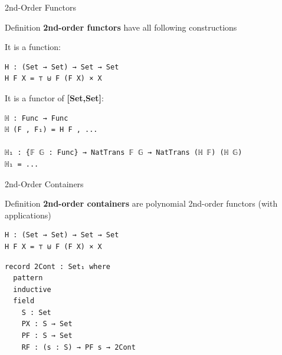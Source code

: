 \documentclass{beamer}
\begin{document}
\begin{frame}[fragile]{2nd-Order Functors}

\begin{block}{Definition}
\textbf{2nd-order functors} have all following constructions
\end{block}

It is a function:

\begin{exampleblock}{}
\begin{verbatim}
H : (Set → Set) → Set → Set
H F X = ⊤ ⊎ F (F X) × X
\end{verbatim}
\end{exampleblock}

It is a functor of \textbf{[Set,Set]}:

\begin{exampleblock}{}
\begin{verbatim}
ℍ : Func → Func
ℍ (F , F₁) = H F , ...

ℍ₁ : {𝔽 𝔾 : Func} → NatTrans 𝔽 𝔾 → NatTrans (ℍ 𝔽) (ℍ 𝔾)
ℍ₁ = ...
\end{verbatim}
\end{exampleblock}
\end{frame}

\begin{frame}[fragile]{2nd-Order Containers}

\begin{block}{Definition}
\textbf{2nd-order containers} are polynomial 2nd-order functors (with applications)
\end{block}

\begin{exampleblock}{}
\begin{verbatim}
H : (Set → Set) → Set → Set
H F X = ⊤ ⊎ F (F X) × X
\end{verbatim}
\end{exampleblock}

\begin{exampleblock}{}
\begin{verbatim}
record 2Cont : Set₁ where
  pattern
  inductive
  field
    S : Set
    PX : S → Set
    PF : S → Set
    RF : (s : S) → PF s → 2Cont
\end{verbatim}
\end{exampleblock}
\end{frame}
\end{document}
